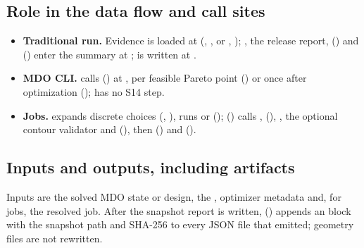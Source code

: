 \subsection{Role in the data flow and call sites}\label{sec:s14-role}
\begin{itemize}
\item \textbf{Traditional run.} Evidence is loaded at  (, , or , ); , the release report,  () and  () enter the summary at ;  is written at .
\item \textbf{MDO CLI.}  calls  () at , per feasible Pareto point () or once after optimization ();  has no S14 step.
\item \textbf{Jobs.}  expands discrete choices (, ), runs  or  ();  () calls ,  (), , the optional contour validator and  (), then  () and  ().
\end{itemize}

\subsection{Inputs and outputs, including artifacts}\label{sec:s14-io}
Inputs are the solved MDO state or design, the , optimizer metadata and, for jobs, the resolved job. After the snapshot report is written,  () appends an  block with the snapshot path and SHA-256 to every JSON file that  emitted; geometry files are not rewritten.


